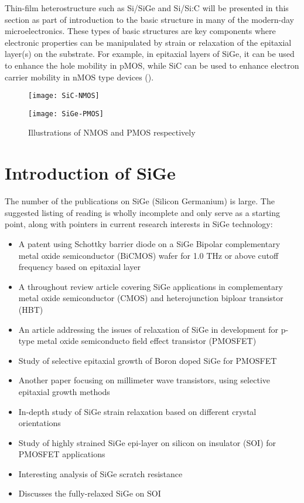 Thin-film heterostructure such as Si/SiGe and Si/Si:C will be presented in this section as part of introduction to the basic structure in many of the modern-day microelectronics.  These types of basic structures are key components where electronic properties can be manipulated by strain or relaxation of the epitaxial layer(s) on the substrate.  For example, in epitaxial layers of SiGe, it can be used to enhance the hole mobility in pMOS, while SiC can be used to enhance electron carrier mobility in nMOS type devices ().

\begin{figure}[h]
\caption{Illustrations of NMOS and PMOS respectively}
\label{MOS}
\begin{minipage}{0.5\linewidth}\texttt{[image: SiC-NMOS]}\end{minipage}\begin{minipage}{0.5\linewidth}
\texttt{[image: SiGe-PMOS]}\end{minipage}\end{figure}


\section{Introduction of SiGe}

	The number of the publications on SiGe (Silicon Germanium) is large.  The suggested listing of reading is wholly incomplete and only serve as a starting point, along with pointers in current research interests in SiGe technology:

{\SingleSpacing
\begin{itemize}
\item  A patent using Schottky barrier diode on a SiGe Bipolar complementary metal oxide semiconductor (BiCMOS) wafer for 1.0 THz or above cutoff frequency based on epitaxial layer \cite{JOHNSON:2011}
\item A throughout review article covering SiGe applications in complementary metal oxide semiconductor (CMOS) and heterojunction biploar transistor (HBT)  \cite{Paul1}
\item  An article addressing the issues of relaxation of SiGe  in development for p-type metal oxide semiconducto field effect transistor (PMOSFET) \cite{Yu1}
\item Study of selective epitaxial growth of Boron doped SiGe for PMOSFET \cite{Kolahdouz1}
\item  Another paper focusing on millimeter wave transistors, using selective epitaxial growth methods \cite{Fox1}
\item In-depth study of SiGe strain relaxation based on different crystal orientations \cite{Trinkaus1}
\item Study of highly strained SiGe epi-layer on silicon on insulator (SOI) for PMOSFET applications \cite{Suh1}
\item Interesting analysis of SiGe scratch resistance \cite{Lin3}
\item Discusses the fully-relaxed SiGe on SOI \cite{Xue1}
\end{itemize}
}

